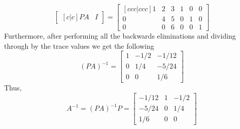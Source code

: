 \begin{enumerate}[label=(\alph*)]
\begin{mdframed}[style=MyFrame]
            \begin{equation}
                \begin{bmatrix}[c|c]
                    PA  &   I
                \end{bmatrix}
                = 
                \begin{bmatrix}[ccc|ccc]
                    1   &   2   &   3   &   1   &   0   &   0   \\
                    0   &   4   &   5   &   0   &   1   &   0   \\
                    0   &   0   &   6   &   0   &   0   &   1
                \end{bmatrix}
            \end{equation}
            Furthermore, after performing all the backwards eliminations 
            and dividing through by the trace values we get the following
            \begin{equation}
                (PA)^{-1}   =
                    \begin{bmatrix}
                        1       &       -1/2        &       -1/12       \\
                        0       &       1/4         &       -5/24       \\
                        0       &       0           &       1/6
                    \end{bmatrix}
            \end{equation}
            Thus,
            \begin{equation}
                A^{-1} = (PA)^{-1}P =
                \begin{bmatrix}
                    -1/12       &       1       &       -1/2        \\
                    -5/24       &       0       &       1/4         \\
                    1/6         &       0       &       0           
                \end{bmatrix}
            \end{equation}
        \end{mdframed}
\end{enumerate}
